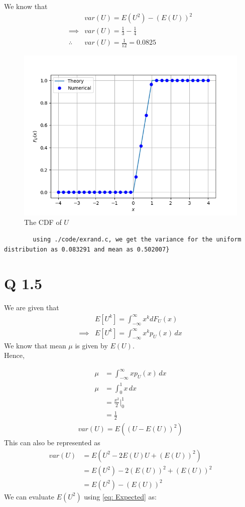 \documentclass[journal,12pt,twocolumn]{IEEEtran}
\begin{document}
We know that
\begin{align}
    &var(U) = E(U^2) - (E(U))^2 \\
    \implies&var(U) = \frac{1}{3} - \frac{1}{4} \\
    \therefore &var(U) = \frac{1}{12} = 0.0825
\end{align}
\begin{figure}[!ht]
\centering
\includegraphics[width=\columnwidth]{./figs/Figure_Q1.png}
\caption{The CDF of $U$}
\label{fig: uniform distribution}
\end{figure}


    \begin{lstlisting}
        using ./code/exrand.c, we get the variance for the uniform distribution as 0.083291 and mean as 0.502007}
    \end{lstlisting}
\section {Q 1.5}
We are given that
\begin{align}
            &E[U^k] = \int^{\infty}_{-\infty} x^k dF_U(x)\\
    \implies&E[U^k] = \int^{\infty}_{-\infty} x^k p_U(x) \,dx		\label{eq: Expected}
\end{align}
We know that mean $\mu$ is given by $E(U)$.\\ Hence,

\begin{align}
    \mu &= \int_{-\infty}^{\infty} x p_U(x) \,dx\label{eq:Relation_1}\\
		\mu &= \int_{0}^{1} x \,dx \\
		&= \frac{x^2}{2} \big|^{1}_{0} \\
		&= \frac{1}{2} 	\label{eq: Mean}
\end{align}
\begin{align}
    var(U) = E((U - E(U))^2)
\end{align}
This can also be represented as
\begin{align}
		var(U) &= E(U^2 - 2E(U)U + (E(U))^2) \\
		&= E(U^2) - 2(E(U))^2 + (E(U))^2 \\
		&= E(U^2) - (E(U))^2
		\label{eq: Relation_2}
\end{align}
We can evaluate $E(U^2)$ using \eqref{eq: Expected} as:
	
\end{document}
